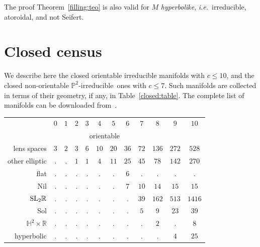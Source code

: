 \documentclass[10pt]{article}      %
\newcommand{\matR} {\ensuremath {\mathbb{R}}}
\newcommand{\matH} {\ensuremath {\mathbb{H}}}
\newcommand{\matP} {\ensuremath {\mathbb{P}}}
\newcommand{\Sol}{{\rm Sol}}
\newcommand{\ptwoirred}{$\matP^2$-irreducible}
\begin{document}
\begin{remark} The proof Theorem~\ref{filling:teo} is also 
valid for $M$ \emph{hyperbolike}, \emph{i.e.}~irreducible, atoroidal, and not Seifert.
\end{remark}

\section{Closed census} \label{closed:section}
We describe here the closed orientable irreducible manifolds with $c\leqslant 10$, 
and the closed non-orientable \ptwoirred\ ones with $c\leqslant 7$.
Such manifolds are collected in terms of their geometry, if any, in Table~\ref{closed:table}. 
The complete list of manifolds can be downloaded from~\cite{weblist}.
\begin{table}
  \begin{center}
    \begin{tabular}{rccccccccccc}
      & $0$ & $1$ & $2$ & $3$ & $4$ & $5$ & $6$ & $7$ & $8$ & $9$ & $10$ \\
      
      \multicolumn{12}{c}{orientable\phantom{\Big|}} \\

      lens spaces &
      $3$ & $2$ & $3$ & $6$ & $10$ & $20$ & $36$ & $72$ & $136$ & $272$ & $528$ \\

      other elliptic &
      . & . & $1$ & $1$ & $4$ & $11$ & $25$ & $45$ & $78$ & $142$ & $270$\\

      flat &
      . & . & . & . & . & . & $6$ & .    & .    & .      & .	 \\
      
      Nil &
      . & . & . & . & . & . & $7$ & $10$ & $14$ & $15$   & $15$\\

      ${\rm SL}_2\matR$ &
      . & . & . & . & . & . & .   & $39$ & $162$ & $513$ & $1416$\\
      
      \Sol &
      . & . & . & . & . & . & .   & $5$  & $9$   & $23$  & $39$\\

      $\matH^2\times\matR$ &
      . & . & . & . & . & . & .   & .    & $2$   & .     & $8$\\
      
      hyperbolic &
      . & . & . & . & . & . & .   & .    & .     & $4$   & $25$\\
      

\end{tabular}
\end{center}
\end{table}
\end{document}
